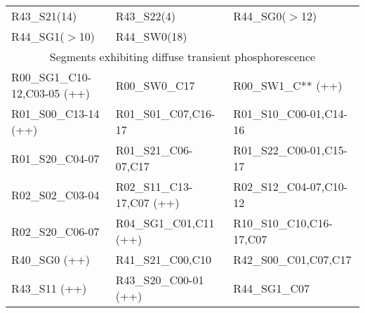 \begin{center}
\begin{longtable}{lll}
R43\_S21(14) & R43\_S22(4) & R44\_SG0($>$12) \\
R44\_SG1($>$10) & R44\_SW0(18) & \\
\midrule
\multicolumn{3}{c}{Segments exhibiting diffuse transient phosphorescence} \\
\midrule
R00\_SG1\_C10-12,C03-05 (++) & R00\_SW0\_C17 & R00\_SW1\_C** (++) \\
R01\_S00\_C13-14 (++) & R01\_S01\_C07,C16-17 & R01\_S10\_C00-01,C14-16 \\
R01\_S20\_C04-07 & R01\_S21\_C06-07,C17 & R01\_S22\_C00-01,C15-17 \\
R02\_S02\_C03-04 & R02\_S11\_C13-17,C07 (++) & R02\_S12\_C04-07,C10-12 \\
R02\_S20\_C06-07 & R04\_SG1\_C01,C11 (++) & R10\_S10\_C10,C16-17,C07 \\
R40\_SG0 (++) & R41\_S21\_C00,C10 & R42\_S00\_C01,C07,C17 \\
R43\_S11 (++) & R43\_S20\_C00-01 (++) & R44\_SG1\_C07 \\
\end{longtable}
\end{center}

